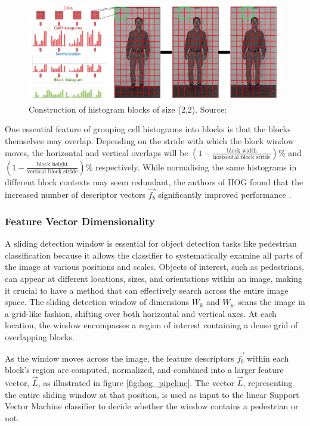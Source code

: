 \begin{figure}
    \centering
    \includegraphics[width=0.75\linewidth]{images/normalisation.png}
    \caption{Construction of histogram blocks of size (2,2). Source: \cite{shidlovskiy_2020_reducing}}
    \label{fig:normalisation}
\end{figure}

One essential feature of grouping cell histograms into blocks is that the blocks themselves may overlap. Depending on the stride with which the block window moves, the horizontal and vertical overlaps will be $(1-\frac{\text{block width}}{\text{horizontal block stride}})\%$ and $(1-\frac{\text{block height}}{\text{vertical block stride}})\%$ respectively. While normalising the same histograms in different block contexts may seem redundant, the authors of HOG found that the increased number of descriptor vectors $\vec{f_b}$ significantly improved performance \cite{dalal_2005_histograms}.


\subsubsection{Feature Vector Dimensionality}\label{sec:feature_vector_dimensionality}

A sliding detection window is essential for object detection tasks like pedestrian classification because it allows the classifier to systematically examine all parts of the image at various positions and scales. Objects of interest, such as pedestrians, can appear at different locations, sizes, and orientations within an image, making it crucial to have a method that can effectively search across the entire image space. The sliding detection window of dimensions  $W_h$ and $W_w$ scans the image in a grid-like fashion, shifting over both horizontal and vertical axes. At each location, the window encompasses a region of interest containing a dense grid of overlapping blocks.

As the window moves across the image, the feature descriptors $\vec{f_b}$ within each block's region are computed, normalized, and combined into a larger feature vector, $\vec{L}$, as illustrated in figure \ref{fig:hog_pipeline}. The vector $\vec{L}$, representing the entire sliding window at that position, is used as input to the linear Support Vector Machine classifier to decide whether the window contains a pedestrian or not. 

